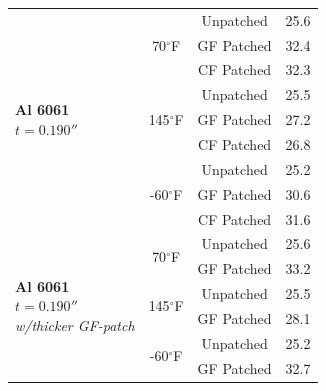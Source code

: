 \documentclass[journal,article,submit,pdftex,moreauthors]{Definitions/mdpi}
\begin{document}
\begin{table}[H]
\begin{tabular}{p{3cm} c c c}
\midrule

\multirow{9}{*}{\parbox{3cm}{\centering \textbf{Al 6061}\\ \textit{$t = 0.190''$}}}
  & \multirow{3}{*}{70$^\circ$F}
      & Unpatched   & 25.6 \\
  &   & GF Patched  & 32.4 \\
  &   & CF Patched  & 32.3 \\[3pt]

  & \multirow{3}{*}{145$^\circ$F}
      & Unpatched   & 25.5 \\
  &   & GF Patched  & 27.2 \\
  &   & CF Patched  & 26.8 \\[3pt]

  & \multirow{3}{*}{-60$^\circ$F}
      & Unpatched   & 25.2 \\
  &   & GF Patched  & 30.6 \\
  &   & CF Patched  & 31.6 \\

\midrule

\multirow{9}{*}{\parbox{3cm}{\centering \textbf{Al 6061}\\ \textit{$t = 0.190''$} \\
\textit{w/thicker GF-patch}\\}}

  & \multirow{2}{*}{70$^\circ$F}
      & Unpatched   & 25.6 \\
  &   & GF Patched  & 33.2 \\[3pt]

  & \multirow{2}{*}{145$^\circ$F}
      & Unpatched   & 25.5 \\
  &   & GF Patched  & 28.1 \\[3pt]

  & \multirow{2}{*}{-60$^\circ$F}
      & Unpatched   & 25.2 \\
  &   & GF Patched  & 32.7 \\

\bottomrule
\end{tabular}
\end{table}

\clearpage
\end{document}
